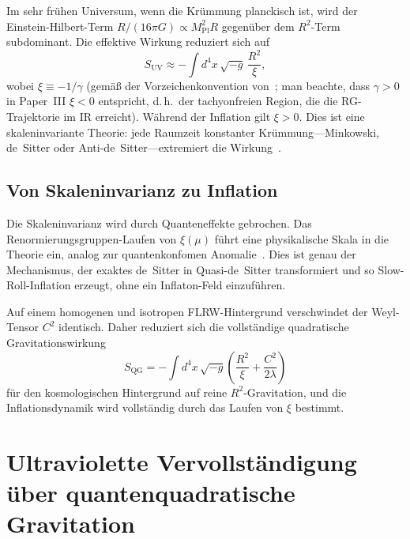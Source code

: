 \documentclass[aps,prd,twocolumn,superscriptaddress,nofootinbib]{revtex4-2}
\begin{document}
Im sehr frühen Universum, wenn die Krümmung planckisch ist, wird der Einstein-Hilbert-Term $R/(16\pi G) \propto M_\mathrm{Pl}^2 R$ gegenüber dem $R^2$-Term subdominant. Die effektive Wirkung reduziert sich auf
\begin{equation}
S_\mathrm{UV} \approx -\int d^4x\,\sqrt{-g}\,\frac{R^2}{\xi},
\label{eq:pure-r2}
\end{equation}
wobei $\xi \equiv -1/\gamma$ (gemäß der Vorzeichenkonvention von~\cite{LiuQuintinAfshordi2026}; man beachte, dass $\gamma > 0$ in Paper~III $\xi < 0$ entspricht, d.\,h.\ der tachyonfreien Region, die die RG-Trajektorie im IR erreicht). Während der Inflation gilt $\xi > 0$. Dies ist eine skaleninvariante Theorie: jede Raumzeit konstanter Krümmung---Minkowski, de~Sitter oder Anti-de~Sitter---extremiert die Wirkung~\cite{Hell2024,Hell2025}.

\subsection{Von Skaleninvarianz zu Inflation}

Die Skaleninvarianz wird durch Quanteneffekte gebrochen. Das Renormierungsgruppen-Laufen von $\xi(\mu)$ führt eine physikalische Skala in die Theorie ein, analog zur quantenkonfomen Anomalie~\cite{CapperDuff1974,Duff1994}. Dies ist genau der Mechanismus, der exaktes de~Sitter in Quasi-de~Sitter transformiert und so Slow-Roll-Inflation erzeugt, ohne ein Inflaton-Feld einzuführen.

Auf einem homogenen und isotropen FLRW-Hintergrund verschwindet der Weyl-Tensor $C^2$ identisch. Daher reduziert sich die vollständige quadratische Gravitationswirkung
\begin{equation}
S_\mathrm{QG} = -\int d^4x\,\sqrt{-g}\left(\frac{R^2}{\xi} + \frac{C^2}{2\lambda}\right)
\label{eq:quad-gravity}
\end{equation}
für den kosmologischen Hintergrund auf reine $R^2$-Gravitation, und die Inflationsdynamik wird vollständig durch das Laufen von $\xi$ bestimmt.


\section{Ultraviolette Vervollständigung über quantenquadratische Gravitation}
\label{sec:uv-completion}
\end{document}

